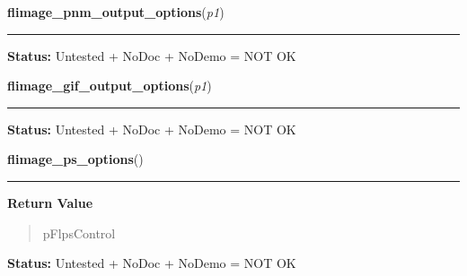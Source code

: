     \vspace{0.5ex}

\hspace{.8\funcindent}\begin{boxedminipage}{\funcwidth}

    \raggedright \textbf{flimage\_pnm\_output\_options}(\textit{p1})

    \vspace{-1.5ex}

    \rule{\textwidth}{0.5\fboxrule}
\setlength{\parskip}{2ex}
\setlength{\parskip}{1ex}
\textbf{Status:} Untested + NoDoc + NoDemo = NOT OK



    \end{boxedminipage}

    \label{xformslib:flflimage:flimage_gif_output_options}

    \vspace{0.5ex}

\hspace{.8\funcindent}\begin{boxedminipage}{\funcwidth}

    \raggedright \textbf{flimage\_gif\_output\_options}(\textit{p1})

    \vspace{-1.5ex}

    \rule{\textwidth}{0.5\fboxrule}
\setlength{\parskip}{2ex}
\setlength{\parskip}{1ex}
\textbf{Status:} Untested + NoDoc + NoDemo = NOT OK



    \end{boxedminipage}

    \label{xformslib:flflimage:flimage_ps_options}

    \vspace{0.5ex}

\hspace{.8\funcindent}\begin{boxedminipage}{\funcwidth}

    \raggedright \textbf{flimage\_ps\_options}()

    \vspace{-1.5ex}

    \rule{\textwidth}{0.5\fboxrule}
\setlength{\parskip}{2ex}
\setlength{\parskip}{1ex}
      \textbf{Return Value}
    \vspace{-1ex}

      \begin{quote}
      pFlpsControl

      \end{quote}

\textbf{Status:} Untested + NoDoc + NoDemo = NOT OK



    \end{boxedminipage}

